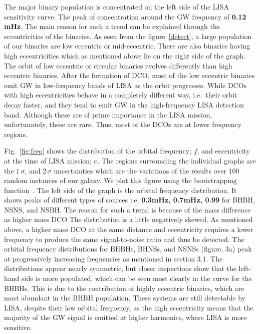 \documentclass[12pt, journal, onecolumn]{IEEEtran}
\begin{document}
    The major binary population is concentrated on the left side of the LISA sensitivity curve.
    The peak of concentration around the GW frequency of \textbf{0.12 mHz}.
    The main reason for such a trend can be explained through the eccentricities of the binaries.
    As seen from the figure~\ref{detect}, a large population of our binaries are low eccentric or mid-eccentric.
    There are also binaries having high eccentricities which as mentioned above lie on the right side of the graph.
    The orbit of low eccentric or circular binaries evolves differently than high eccentric binaries.
    After the formation of DCO, most of the low eccentric binaries emit GW in low-frequency bands of LISA as the orbit progresses.
    While DCOs with high eccentricities behave in a completely different way, i.e.\ their orbit decay faster, and they tend to emit GW in the high-frequency LISA detection band.
    Although these are of prime importance in the LISA mission, unfortunately, these are rare.
    Thus, most of the DCOs are at lower frequency regions.

    Fig.~\ref{fig:freq} shows the distribution of the orbital frequency; $f$, and eccentricity at the time of LISA mission; $e$.
    The regions surrounding the individual graphs are the $1\,\sigma$, and $2\,\sigma$ uncertainties which are the variations of the results over 100 random instances of our galaxy.
    We plot this figure using the bootstrapping function~\cite{wagg2021gravitational}.
    The left side of the graph is the orbital frequency distribution.
    It shows peaks of different types of sources i.e. \textbf{0.3mHz, 0.7mHz, 0.99} for BHBH, NSNS, and NSBH\@.
    The reason for such a trend is because of the mass difference as higher mass DCO The distribution is a little negatively skewed.
    As mentioned above, a higher mass DCO at the same distance and eccentricity requires a lower frequency to produce the same signal-to-noise ratio and thus be detected.
    The orbital frequency distributions for BHBHs, BHNSs, and NSNSs (figure, 3a) peak at progressively increasing
    frequencies as mentioned in section 3.1.
    The distributions appear nearly symmetric, but closer inspections show that the left-hand side is more populated, which can be seen most clearly in the curve for the BHBHs.
    This is due to the contribution of highly eccentric binaries, which are most abundant in the BHBH population.
    These systems are still detectable by LISA, despite their low orbital frequency, as the high eccentricity means that the majority of the GW signal is emitted at higher harmonics, where LISA is more sensitive.
\end{document}
